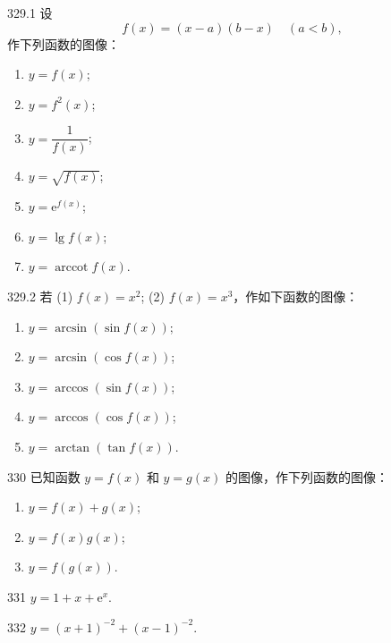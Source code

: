 \begin{prob}[L]{329.1}
设
\[
f(x) = (x - a)(b - x) \quad (a < b),
\]
作下列函数的图像：
\begin{enumerate}[label=(\alph*), itemsep=2pt, topsep=3pt]
  \item $y = f(x)$;
  \item $y = f^2(x)$;
  \item $y = \dfrac{1}{f(x)}$;
  \item $y = \sqrt{f(x)}$;
  \item $y = \mathrm{e}^{f(x)}$;
  \item $y = \lg f(x)$;
  \item $y = \operatorname{arccot} f(x)$.
\end{enumerate}
\end{prob}

\begin{prob}[L]{329.2}
若 (1) $f(x) = x^2$; (2) $f(x) = x^3$，作如下函数的图像：
\begin{enumerate}[label=(\alph*), itemsep=2pt, topsep=3pt]
  \item $y = \arcsin(\sin f(x))$;
  \item $y = \arcsin(\cos f(x))$;
  \item $y = \arccos(\sin f(x))$;
  \item $y = \arccos(\cos f(x))$;
  \item $y = \arctan(\tan f(x))$.
\end{enumerate}
\end{prob}

\begin{prob}[L]{330}
已知函数 $y = f(x)$ 和 $y = g(x)$ 的图像，作下列函数的图像：
\begin{enumerate}[label=(\alph*), itemsep=2pt, topsep=3pt]
  \item $y = f(x) + g(x)$;
  \item $y = f(x)g(x)$;
  \item $y = f(g(x))$.
\end{enumerate}
\end{prob}


\begin{prob}[S]{331}
$y = 1 + x + \mathrm{e}^x$.
\end{prob}

\begin{prob}[S]{332}
$y = (x + 1)^{-2} + (x - 1)^{-2}$.
\end{prob}

